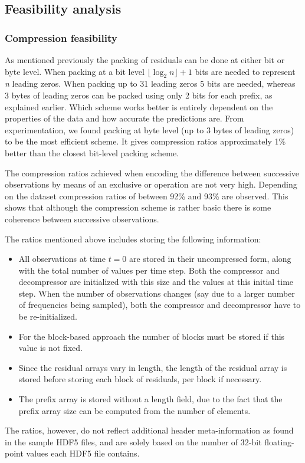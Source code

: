  \subsection{Feasibility analysis}
  \subsubsection{Compression feasibility}
  As mentioned previously the packing of residuals can be done at either bit or byte level. When packing at a bit level $\lfloor\log_2n\rfloor + 1$ bits are needed to represent
  \textit{n} leading zeros. When packing up to 31 leading zeros 5 bits are needed, whereas 3 bytes of leading zeros can be packed using only 2 bits for each prefix, as explained earlier. Which scheme
  works better is entirely dependent on the properties of the data and how accurate the predictions are. From experimentation, we found packing at byte level (up to 3 bytes of leading zeros) to be the most 
  efficient scheme. It gives compression ratios approximately 1\% better than the closest bit-level packing scheme. 
  
  The compression ratios achieved when encoding the difference between successive observations by means of an exclusive or operation are not very high. Depending on the dataset compression ratios of between 
  92\% and 93\% are observed. This shows that although the compression scheme is rather basic there is some coherence between successive observations. 
  
  The ratios mentioned above includes storing the following information:
  \begin{itemize}
   \item All observations at time $t=0$ are stored in their uncompressed form, along with the total number of values per time step. Both the compressor and decompressor are 
   initialized with this size and the values at this initial time step. When the number of observations changes (say due to a larger number of frequencies being sampled), both the
   compressor and decompressor have to be re-initialized.
   \item For the block-based approach the number of blocks must be stored if this value is not fixed.
   \item Since the residual arrays vary in length, the length of the residual array is stored before storing each block of residuals, per block if necessary.
   \item The prefix array is stored without a length field, due to the fact that the prefix array size can be computed from the number of elements.
  \end{itemize}
  The ratios, however, do not reflect additional header meta-information as found in the sample HDF5 files, and are solely based on the number of 32-bit floating-point values each
  HDF5 file contains. 
